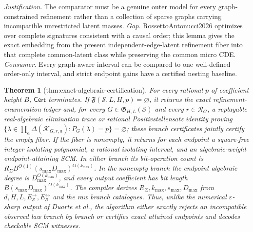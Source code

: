 \documentclass{article}
\newtheorem{theorem}{Theorem}
\begin{document}
\par\smallskip\noindent \textit{Justification.} The comparator must be a genuine outer model for every graph-constrained refinement rather than a collection of sparse graphs carrying incompatible unrestricted latent masses. \textit{Gap.} RossettoAntonucci2026 optimizes over complete signatures consistent with a causal order; this lemma gives the exact embedding from the present independent-edge-latent refinement fiber into that complete common-latent class while preserving the common micro CDE. \textit{Consumer.} Every graph-aware interval can be compared to one well-defined order-only interval, and strict endpoint gains have a certified nesting baseline.

\begin{theorem}[thm:exact-algebraic-certification]\label{thm:exact-algebraic-certification}
For every rational \(p\) of coefficient height \(B\), \(\mathsf{Cert}\) terminates. If \(\mathfrak F(\mathcal S,L,H,p)=\varnothing\), it returns the exact refinement-enumeration ledger and, for every \(G\in\mathfrak G_{H,L}(\mathcal S)\) and every \(r\in\mathcal R_G\), a replayable real-algebraic elimination trace or rational Positivstellensatz identity proving \(\{\lambda\in\prod_a\Delta(\mathcal K_{G,r,a}):P_G(\lambda)=p\}=\varnothing\); these branch certificates jointly certify the empty fiber. If the fiber is nonempty, it returns for each endpoint a square-free integer isolating polynomial, a rational isolating interval, and an algebraic-weight endpoint-attaining SCM. In either branch its bit-operation count is \(R_{\Sigma}B^{O(1)}(s_{\max}D_{\max})^{O(k_{\max})}\). In the nonempty branch the endpoint algebraic degree is \(D_{\max}^{O(k_{\max})}\), and every output coefficient has bit length \(B(s_{\max}D_{\max})^{O(k_{\max})}\). The compiler derives \(R_{\Sigma},k_{\max},s_{\max},D_{\max}\) from \(d,H,L,E_{\mathcal S}^{\to},E_{\mathcal S}^{\leftrightarrow}\) and the raw branch catalogues. Thus, unlike the numerical \(\varepsilon\)-sharp output of Duarte et al., the algorithm either exactly rejects an incompatible observed law branch by branch or certifies exact attained endpoints and decodes checkable SCM witnesses.
\end{theorem}
\end{document}

